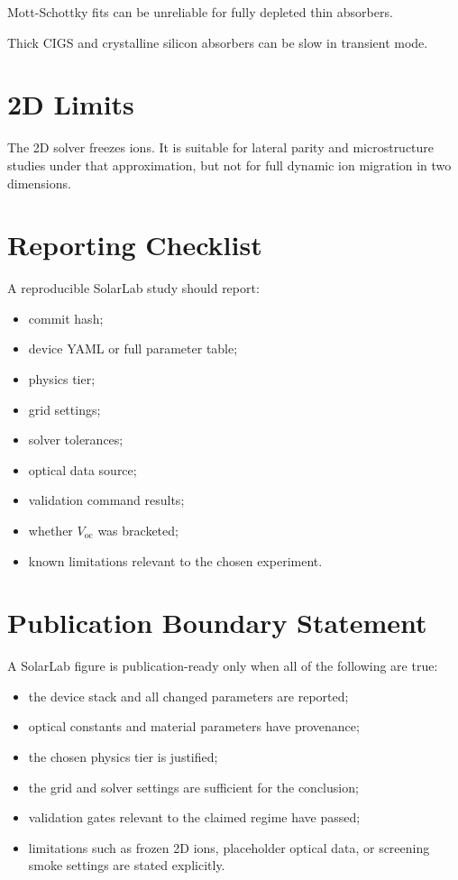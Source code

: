 \documentclass[
  11pt,
  american,
]{report}
\providecommand{\tightlist}{%
  \setlength{\itemsep}{0pt}\setlength{\parskip}{0pt}}
\begin{document}
Mott-Schottky fits can be unreliable for fully depleted thin absorbers.

Thick CIGS and crystalline silicon absorbers can be slow in transient
mode.

\hypertarget{d-limits}{%
\section{2D Limits}\label{d-limits}}

The 2D solver freezes ions. It is suitable for lateral parity and
microstructure studies under that approximation, but not for full
dynamic ion migration in two dimensions.

\hypertarget{reporting-checklist}{%
\section{Reporting Checklist}\label{reporting-checklist}}

A reproducible SolarLab study should report:

\begin{itemize}
\tightlist
\item
  commit hash;
\item
  device YAML or full parameter table;
\item
  physics tier;
\item
  grid settings;
\item
  solver tolerances;
\item
  optical data source;
\item
  validation command results;
\item
  whether \(V_\mathrm{oc}\) was bracketed;
\item
  known limitations relevant to the chosen experiment.
\end{itemize}

\hypertarget{publication-boundary-statement}{%
\section{Publication Boundary
Statement}\label{publication-boundary-statement}}

A SolarLab figure is publication-ready only when all of the following
are true:

\begin{itemize}
\tightlist
\item
  the device stack and all changed parameters are reported;
\item
  optical constants and material parameters have provenance;
\item
  the chosen physics tier is justified;
\item
  the grid and solver settings are sufficient for the conclusion;
\item
  validation gates relevant to the claimed regime have passed;
\item
  limitations such as frozen 2D ions, placeholder optical data, or
  screening smoke settings are stated explicitly.
\end{itemize}
\end{document}
